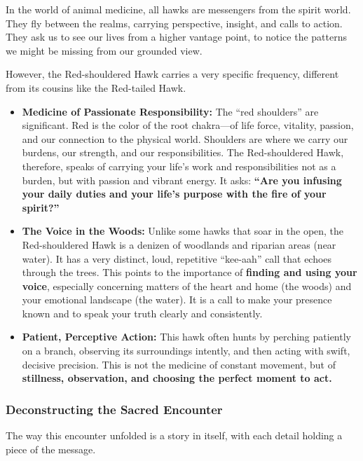 \documentclass{article}
\begin{document}
In the world of animal medicine, all hawks are messengers from the
spirit world. They fly between the realms, carrying perspective,
insight, and calls to action. They ask us to see our lives from a higher
vantage point, to notice the patterns we might be missing from our
grounded view.

However, the Red-shouldered Hawk carries a very specific frequency,
different from its cousins like the Red-tailed Hawk.

\begin{itemize}
\item
  \textbf{Medicine of Passionate Responsibility:} The ``red shoulders''
  are significant. Red is the color of the root chakra---of life force,
  vitality, passion, and our connection to the physical world. Shoulders
  are where we carry our burdens, our strength, and our
  responsibilities. The Red-shouldered Hawk, therefore, speaks of
  carrying your life's work and responsibilities not as a burden, but
  with passion and vibrant energy. It asks: \textbf{``Are you infusing
  your daily duties and your life's purpose with the fire of your
  spirit?''}
\item
  \textbf{The Voice in the Woods:} Unlike some hawks that soar in the
  open, the Red-shouldered Hawk is a denizen of woodlands and riparian
  areas (near water). It has a very distinct, loud, repetitive
  ``kee-aah'' call that echoes through the trees. This points to the
  importance of \textbf{finding and using your voice}, especially
  concerning matters of the heart and home (the woods) and your
  emotional landscape (the water). It is a call to make your presence
  known and to speak your truth clearly and consistently.
\item
  \textbf{Patient, Perceptive Action:} This hawk often hunts by perching
  patiently on a branch, observing its surroundings intently, and then
  acting with swift, decisive precision. This is not the medicine of
  constant movement, but of \textbf{stillness, observation, and choosing
  the perfect moment to act.}
\end{itemize}

\subsubsection*{Deconstructing the Sacred
Encounter}\label{deconstructing-the-sacred-encounter}

The way this encounter unfolded is a story in itself, with each detail
holding a piece of the message.
\end{document}

